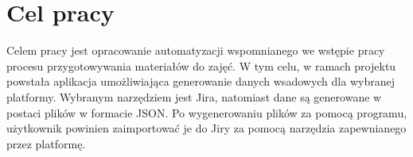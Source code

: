 \section{Cel pracy}
Celem pracy jest opracowanie automatyzacji wspomnianego we wstępie pracy procesu przygotowywania materiałów do zajęć.
W tym celu, w ramach projektu powstała aplikacja umożliwiająca generowanie danych wsadowych dla wybranej platformy.
Wybranym narzędziem jest Jira, natomiast dane są generowane w postaci plików w formacie JSON.
Po wygenerowaniu plików za pomocą programu, użytkownik powinien zaimportować je do Jiry za pomocą narzędzia zapewnianego przez platformę.
